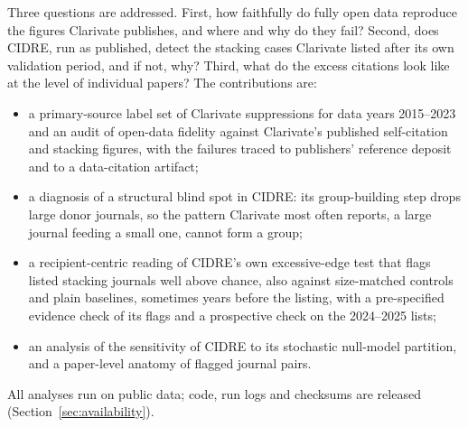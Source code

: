 Three questions are addressed. First, how faithfully do fully open data reproduce the figures Clarivate publishes, and where
and why do they fail? Second, does CIDRE, run as published, detect the stacking cases Clarivate listed after its
own validation period, and if not, why? Third, what do the excess citations look like at the level of individual
papers? The contributions are:
\begin{itemize}
  \item a primary-source label set of Clarivate suppressions for data years 2015--2023 and an audit of open-data
        fidelity against Clarivate's published self-citation and stacking figures, with the failures traced to
        publishers' reference deposit and to a data-citation artifact;
  \item a diagnosis of a structural blind spot in CIDRE: its group-building step drops large donor journals, so the
        pattern Clarivate most often reports, a large journal feeding a small one, cannot form a group;
  \item a recipient-centric reading of CIDRE's own excessive-edge test that flags listed stacking journals well above
        chance, also against size-matched controls and plain baselines, sometimes years before the listing, with a
        pre-specified evidence check of its flags and a prospective check on the 2024--2025 lists;
  \item an analysis of the sensitivity of CIDRE to its stochastic null-model partition, and a paper-level anatomy of
        flagged journal pairs.
\end{itemize}
All analyses run on public data; code, run logs and checksums are released (Section~\ref{sec:availability}).

